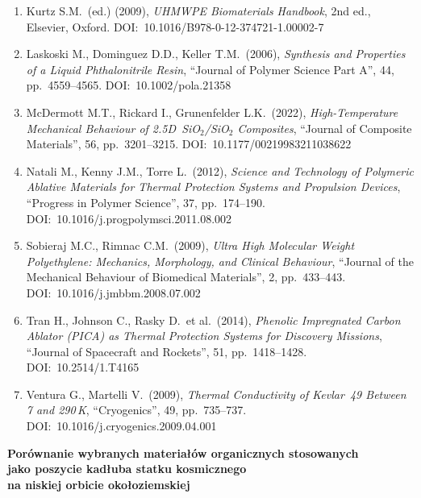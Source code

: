 \documentclass[11pt,a4paper]{article}
\begin{document}
{\begin{enumerate}[label=\arabic*., leftmargin=1.5cm, topsep=0pt,
                  itemsep=0pt, parsep=0pt]
  \item Kurtz S.M.\ (ed.) (2009), \textit{UHMWPE Biomaterials Handbook}, 2nd ed.,
    Elsevier, Oxford. DOI:~10.1016/B978-0-12-374721-1.00002-7

  \item Laskoski M., Dominguez D.D., Keller T.M.\ (2006), \textit{Synthesis and
    Properties of a Liquid Phthalonitrile Resin}, ``Journal of Polymer Science
    Part A'', 44, pp.\ 4559--4565. DOI:~10.1002/pola.21358

  \item McDermott M.T., Rickard I., Grunenfelder L.K.\ (2022), \textit{High-Temperature
    Mechanical Behaviour of 2.5D~SiO$_{2}$/SiO$_{2}$ Composites}, ``Journal of
    Composite Materials'', 56, pp.\ 3201--3215. DOI:~10.1177/00219983211038622

  \item Natali M., Kenny J.M., Torre L.\ (2012), \textit{Science and Technology of
    Polymeric Ablative Materials for Thermal Protection Systems and Propulsion
    Devices}, ``Progress in Polymer Science'', 37, pp.\ 174--190.
    DOI:~10.1016/j.progpolymsci.2011.08.002

  \item Sobieraj M.C., Rimnac C.M.\ (2009), \textit{Ultra High Molecular Weight
    Polyethylene: Mechanics, Morphology, and Clinical Behaviour}, ``Journal of
    the Mechanical Behaviour of Biomedical Materials'', 2, pp.\ 433--443.
    DOI:~10.1016/j.jmbbm.2008.07.002

  \item Tran H., Johnson C., Rasky D.\ et al.\ (2014), \textit{Phenolic Impregnated
    Carbon Ablator (PICA) as Thermal Protection Systems for Discovery Missions},
    ``Journal of Spacecraft and Rockets'', 51, pp.\ 1418--1428.
    DOI:~10.2514/1.T4165

  \item Ventura G., Martelli V.\ (2009), \textit{Thermal Conductivity of Kevlar~49
    Between 7 and 290\,K}, ``Cryogenics'', 49, pp.\ 735--737.
    DOI:~10.1016/j.cryogenics.2009.04.001

\end{enumerate}
}

\vspace{18pt}
\begin{center}
  {\cambriafont\fontsize{11}{13.2}\selectfont\bfseries
    Porównanie wybranych materiałów organicznych stosowanych\\
    jako poszycie kadłuba statku kosmicznego\\
    na niskiej orbicie okołoziemskiej\par}
\end{center}
\end{document}
